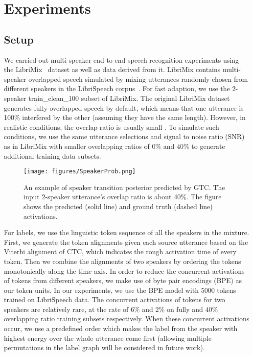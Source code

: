 \documentclass{article}
\begin{document}
\section{Experiments}
\label{sec:experiments}

\subsection{Setup}
\label{ssec:setup}

We carried out multi-speaker end-to-end speech recognition experiments using the LibriMix~\cite{cosentino2020librimix} dataset as well as data derived from it. LibriMix contains multi-speaker overlapped speech simulated by mixing utterances randomly chosen from different speakers in the LibriSpeech corpus~\cite{librispeech}. For fast adaption, we use the 2-speaker train\_clean\_100 subset of LibriMix. The original LibriMix dataset generates fully overlapped speech by default, which means that one utterance is 100\% interfered by the other (assuming they have the same length). However, in realistic conditions, the overlap ratio is usually small \cite{cetin1analysis,chen2020continuous}. To simulate such conditions, we use the same utterance selections and signal to noise ratio (SNR) as in LibriMix with smaller overlapping ratios of $0\%$ and $40\%$ to generate additional training data subsets.

\begin{figure*}[t]
    \centering
    \texttt{[image: figures/SpeakerProb.png]}
    \vspace{-20 pt}
    \caption{An example of speaker transition posterior predicted by GTC. The input 2-speaker utterance's overlap ratio is about $40\%$. The figure shows the predicted (solid line) and ground truth (dashed line) activations.}
    \label{fig:speaker_probability}
    \vspace{-20 pt}
\end{figure*}

For labels, we use the linguistic token sequence of all the speakers in the mixture. First, we generate the token alignments given each source utterance based on the Viterbi alignment of CTC, which indicates the rough activation time of every token. Then we combine the alignments of two speakers by ordering the tokens monotonically along the time axis. In order to reduce the concurrent activations of tokens from different speakers, we make use of byte pair encodings (BPE) as our token units. In our experiments, we use the BPE model with 5000 tokens trained on LibriSpeech data. The concurrent activations of tokens for two speakers are relatively rare, at the rate of $6\%$ and $2\%$ on fully and $40\%$ overlapping ratio training subsets respectively. 
When these concurrent activations occur, we 
use a predefined order which makes the label from the speaker with highest energy over the whole utterance come first (allowing multiple permutations in the label graph will be considered in future work).
\end{document}
